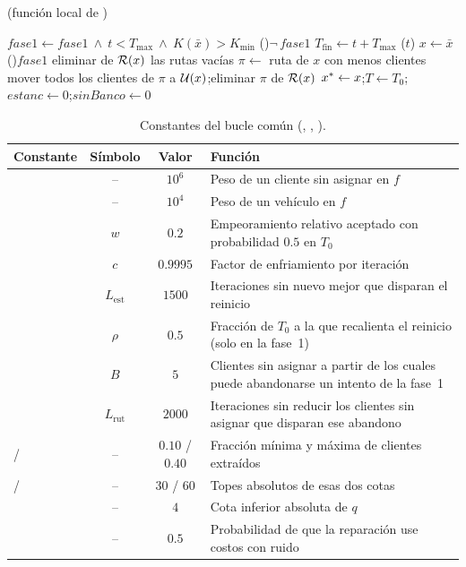 \begin{algorithm}[H]
\caption{ (función local  de )}
\label{alg:etapa}
$\textit{fase1}\gets\textit{fase1}\ \wedge\ t<T_{\max}\ \wedge\ K(\bar{x})>K_{\min}$\;
\Si(){$\neg\,\textit{fase1}$}{
  $T_{\mathrm{fin}}\gets t+T_{\max}$\;
  ($t$) 
}
$x\gets\bar{x}$\;
\Si(){$\textit{fase1}$}{
  eliminar de $\mathcal{R}(x)$ las rutas vacías\;
  $\pi\gets$ ruta de $x$ con menos clientes\;
  mover todos los clientes de $\pi$ a $\mathcal{U}(x)$;\quad eliminar $\pi$ de $\mathcal{R}(x)$\;
}
$x^{*}\gets x$;\quad $T\gets T_0$;\quad $\textit{estanc}\gets 0$;\quad $\textit{sinBanco}\gets 0$\;
\end{algorithm}

\begin{table}[H]
\centering
\small
\caption{Constantes del bucle común (, , ).}
\label{tab:const-base}
\begin{tabularx}{\textwidth}{@{}l c c L@{}}
\toprule
Constante & Símbolo & Valor & Función \\
\midrule
{} & -- & $10^6$ & Peso de un cliente sin asignar en $f$ \\
 & -- & $10^4$ & Peso de un vehículo en $f$ \\
 & $w$ & $0.2$ & Empeoramiento relativo aceptado con probabilidad $0.5$ en $T_0$ \\
 & $c$ & $0.9995$ & Factor de enfriamiento por iteración \\
 & $L_{\mathrm{est}}$ & $1500$ & Iteraciones sin nuevo mejor que disparan el reinicio \\
 & $\rho$ & $0.5$ & Fracción de $T_0$ a la que recalienta el reinicio (solo en la fase~1) \\
 & $B$ & $5$ & Clientes sin asignar a partir de los cuales puede abandonarse un intento de la fase~1 \\
 & $L_{\mathrm{rut}}$ & $2000$ & Iteraciones sin reducir los clientes sin asignar que disparan ese abandono \\
 /  & -- & $0.10$ / $0.40$ & Fracción mínima y máxima de clientes extraídos \\
 /  & -- & $30$ / $60$ & Topes absolutos de esas dos cotas \\
 & -- & $4$ & Cota inferior absoluta de $q$ \\
 & -- & $0.5$ & Probabilidad de que la reparación use costos con ruido \\
\bottomrule
\end{tabularx}
\end{table}

